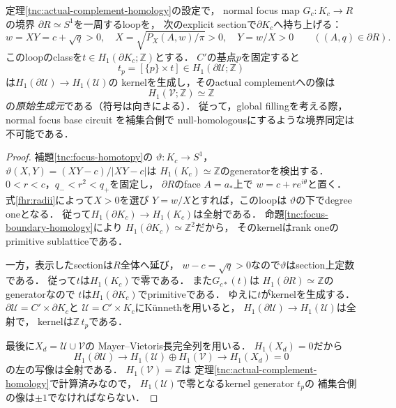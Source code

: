 \begin{proposition}
\label{tnc:focus-boundary-primitive}
定理\ref{tnc:actual-complement-homology}の設定で，
normal focus map $G_c:K_c\to R$の境界
$\partial R\simeq S^1$を一周するloopを，
次のexplicit sectionで$\partial K_c$へ持ち上げる：
\[
 w=XY=c+\sqrt q>0,\quad
 X=\sqrt{P_X(A,w)/\pi}>0,\quad Y=w/X>0
 \qquad ((A,q)\in\partial R).
\]
このloopのclassを$t\in H_1(\partial K_c;\mathbb Z)$とする．
$C'$の基点$p$を固定すると
\[
 t_p=[\{p\}\times t]\in H_1(\partial\mathcal U;\mathbb Z)
\]
は$H_1(\partial\mathcal U)\to H_1(\mathcal U)$の
kernelを生成し，そのactual complementへの像は
\[
 H_1(\mathcal V;\mathbb Z)\simeq\mathbb Z
\]
の\emph{原始生成元}である（符号は向きによる）．
従って，global fillingを考える際，
normal focus base circuit を補集合側で
null-homologousにするような境界同定は不可能である．
\end{proposition}
\begin{proof}
補題\ref{tnc:focus-homotopy}の
$\vartheta:K_c\to S^1$，
$\vartheta(X,Y)=(XY-c)/|XY-c|$は
$H_1(K_c)\simeq\mathbb Z$のgeneratorを検出する．
$0<r<c$，$q_-<r^2<q_+$を固定し，
$\partial R$のface $A=a_*$上で
$w=c+r e^{i\theta}$と置く．
式\eqref{fhr:radii}によって$X>0$を選び
$Y=w/X$とすれば，このloopは
$\vartheta$の下でdegree oneとなる．
従って$H_1(\partial K_c)\to H_1(K_c)$は全射である．
命題\ref{tnc:focus-boundary-homology}により
$H_1(\partial K_c)\simeq\mathbb Z^2$だから，
そのkernelはrank oneのprimitive sublatticeである．

一方，表示したsectionは$R$全体へ延び，
$w-c=\sqrt q>0$なので$\vartheta$はsection上定数である．
従って$t$は$H_1(K_c)$で零である．
また$G_{c*}(t)$は
$H_1(\partial R)\simeq\mathbb Z$のgeneratorなので
$t$は$H_1(\partial K_c)$でprimitiveである．
ゆえに$t$がkernelを生成する．
$\partial\mathcal U=C'\times\partial K_c$と
$\mathcal U=C'\times K_c$にK\"unnethを用いると，
$H_1(\partial\mathcal U)\to H_1(\mathcal U)$は全射で，
kernelは$\mathbb Z\,t_p$である．

最後に$X_d=\mathcal U\cup\mathcal V$の
Mayer--Vietoris長完全列を用いる．
$H_1(X_d)=0$だから
\[
 H_1(\partial\mathcal U)
 \longrightarrow H_1(\mathcal U)\oplus H_1(\mathcal V)
 \longrightarrow H_1(X_d)=0
\]
の左の写像は全射である．
$H_1(\mathcal V)=\mathbb Z$は
定理\ref{tnc:actual-complement-homology}で計算済みなので，
$H_1(\mathcal U)$で零となるkernel generator $t_p$の
補集合側の像は$\pm1$でなければならない．
\end{proof}

